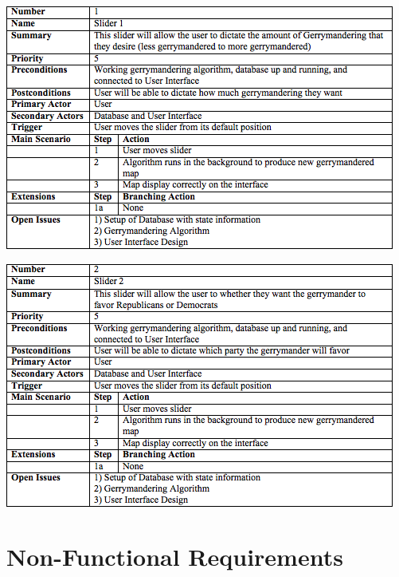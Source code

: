 \documentclass{article}
\begin{document}
\begin{addmargin}[4em]{0em}


\begin{center}
\hspace*{-2cm}      
\includegraphics[scale=.8]{Slider1.png}
\end{center}



\begin{center}
\hspace*{-2cm}      
\includegraphics[scale=.8]{Slider2.png}
\end{center}


\end{addmargin}

\vspace{2.5mm}


\section{Non-Functional Requirements}\label{sec:non-functionalReq}
\end{document}
